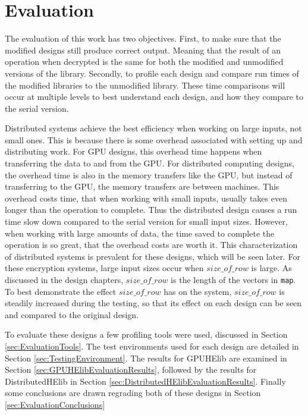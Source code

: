 \chapter{Evaluation} \label{chap:Evaluation}
The evaluation of this work has two objectives. First, to make sure that the modified designs still produce correct output. Meaning that the result of an operation when decrypted is the same for both the modified and unmodified versions of the library. Secondly, to profile each design and compare run times of the modified libraries to the unmodified library. These time comparisons will occur at multiple levels to best understand each design, and how they compare to the serial version.

Distributed systems achieve the best efficiency when working on large inputs, not small ones. This is because there is some overhead associated with setting up and distributing work. For GPU designs, this overhead time happens when transferring the data to and from the GPU. For distributed computing designs, the overhead time is also in the memory transfers like the GPU, but instead of transferring to the GPU, the memory transfers are between machines. This overhead costs time, that when working with small inputs, usually takes even longer than the operation to complete. Thus the distributed design causes a run time slow down compared to the serial version for small input sizes. However, when working with large amounts of data, the time saved to complete the operation is so great, that the overhead costs are worth it. This characterization of distributed systems is prevalent for these designs, which will be seen later. For these encryption systems, large input sizes occur when $size\_of\_row$ is large. As discussed in the design chapters, $size\_of\_row$ is the length of the vectors in \verb|map|. To best demonstrate the effect $size\_of\_row$ has on the system, $size\_of\_row$ is steadily increased during the testing, so that its effect on each design can be seen and compared to the original design.

To evaluate these designs a few profiling tools were used, discussed in Section \ref{sec:EvaluationTools}. The test environments used for each design are detailed in Section \ref{sec:TestingEnvironment}. The results for GPUHElib are examined in Section \ref{sec:GPUHElibEvaluationResults}, followed by the results for DistributedHElib in Section \ref{sec:DistributedHElibEvaluationResults}. Finally some conclusions are drawn regrading both of these designs in Section \ref{sec:EvaluationConclusions}

